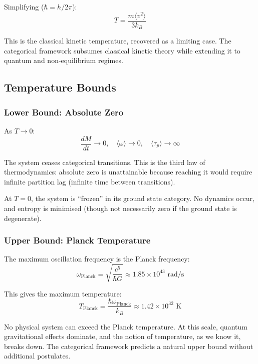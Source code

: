 Simplifying ($\hbar = h/2\pi$):
\begin{equation}
T = \frac{m\langle v^2\rangle}{3k_B}
\end{equation}

This is the classical kinetic temperature, recovered as a limiting case. The categorical framework subsumes classical kinetic theory while extending it to quantum and non-equilibrium regimes.

\subsection{Temperature Bounds}

\subsubsection{Lower Bound: Absolute Zero}

As $T \to 0$:
\begin{equation}
\frac{dM}{dt} \to 0, \quad \langle\omega\rangle \to 0, \quad \langle\tau_p\rangle \to \infty
\end{equation}

The system ceases categorical transitions. This is the third law of thermodynamics: absolute zero is unattainable because reaching it would require infinite partition lag (infinite time between transitions).

At $T = 0$, the system is ``frozen'' in its ground state category. No dynamics occur, and entropy is minimised (though not necessarily zero if the ground state is degenerate).

\subsubsection{Upper Bound: Planck Temperature}

The maximum oscillation frequency is the Planck frequency:
\begin{equation}
\omega_{\text{Planck}} = \sqrt{\frac{c^5}{\hbar G}} \approx 1.85 \times 10^{43} \text{ rad/s}
\end{equation}

This gives the maximum temperature:
\begin{equation}
T_{\text{Planck}} = \frac{\hbar\omega_{\text{Planck}}}{k_B} \approx 1.42 \times 10^{32} \text{ K}
\end{equation}

No physical system can exceed the Planck temperature. At this scale, quantum gravitational effects dominate, and the notion of temperature, as we know it, breaks down. The categorical framework predicts a natural upper bound without additional postulates.

